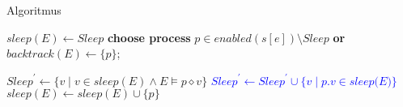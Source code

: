 \documentclass[11pt]{beamer}
\begin{document}


%
\begin{frame}[fragile]{Algoritmus}

\begin{algorithmic} \small
  \State $sleep(E) \gets Sleep$
  \State \textbf{choose process} $p \in \textit{enabled}(s[e]) \setminus \textit{Sleep}$
  \textbf{or} \Return
  \State $\textit{backtrack}(E) \gets \{ p \}$;
  
    \State {}
  
    \State $\textit{Sleep}^\prime \gets \{ v \mid v \in \textit{sleep}(E) \land E \vDash p \diamond v \}$
    \State \textcolor{blue}{$\textit{Sleep}^\prime \gets \textit{Sleep}^\prime \cup \{ v \mid p.v \in \textit{sleep(E)} \}$}
    \State {}
    \State $\textit{sleep}(E) \gets \textit{sleep}(E) \cup \{ p \}$


  \EndWhile  
\EndFunction
\end{algorithmic}
\end{frame}
\end{document}
